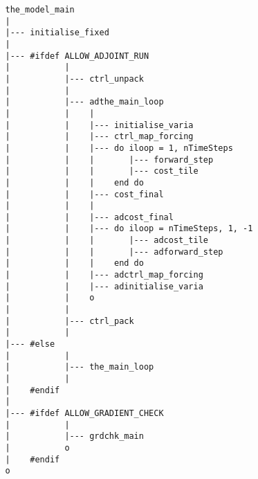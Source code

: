 
{\scriptsize
\begin{verbatim}
   the_model_main
   |
   |--- initialise_fixed
   |
   |--- #ifdef ALLOW_ADJOINT_RUN
   |           |    
   |           |--- ctrl_unpack
   |           |    
   |           |--- adthe_main_loop
   |           |    |
   |           |    |--- initialise_varia
   |           |    |--- ctrl_map_forcing
   |           |    |--- do iloop = 1, nTimeSteps
   |           |    |       |--- forward_step
   |           |    |       |--- cost_tile
   |           |    |    end do
   |           |    |--- cost_final
   |           |    |
   |           |    |--- adcost_final
   |           |    |--- do iloop = nTimeSteps, 1, -1
   |           |    |       |--- adcost_tile
   |           |    |       |--- adforward_step
   |           |    |    end do
   |           |    |--- adctrl_map_forcing
   |           |    |--- adinitialise_varia
   |           |    o
   |           |
   |           |--- ctrl_pack
   |           |
   |--- #else
   |           |
   |           |--- the_main_loop
   |           |
   |    #endif
   |
   |--- #ifdef ALLOW_GRADIENT_CHECK
   |           |
   |           |--- grdchk_main
   |           o
   |    #endif
   o
\end{verbatim}
}
